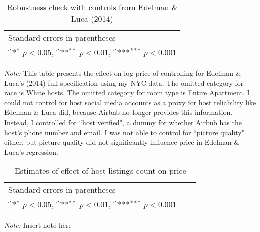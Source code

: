 \begin{table}[htbp]\centering
	\def\sym#1{\ifmmode^{#1}\else\(^{#1}\)\fi}
	
	\caption{Robustness check with controls from Edelman \& Luca (2014)}
	\begin{tabular}{l*{1}{c}}
		\hline\hline
		 
		\hline\hline
		\multicolumn{2}{l}{\footnotesize Standard errors in parentheses}\\
		\multicolumn{2}{l}{\footnotesize \sym{*} \(p<0.05\), \sym{**} \(p<0.01\), \sym{***} \(p<0.001\)}\\
	\end{tabular}
	\label{table:edelman}
	\begin{tablenotes}
		\item {\it Note:} This table presents the effect on log price of controlling for Edelman \& Luca's (2014) full specification using my NYC data. The omitted category for race is White hosts. The omitted category for room type is Entire Apartment. I could not control for host social media accounts as a proxy for host reliability like Edelman \& Luca did, because Airbnb no longer provides this information. Instead, I controlled for ``host verified", a dummy for whether Airbnb has the host's phone number and email. I was not able to control for ``picture quality" either, but picture quality did not significantly influence price in Edelman \& Luca's regression.
	\end{tablenotes}
\end{table}


\begin{table}[htbp]\centering
	\def\sym#1{\ifmmode^{#1}\else\(^{#1}\)\fi}
	\caption{Estimates of effect of host listings count on price}
	\begin{tabular}{l*{6}{c}}
		\hline\hline
		
		\hline\hline
		\multicolumn{5}{l}{\footnotesize Standard errors in parentheses}\\
		\multicolumn{5}{l}{\footnotesize \sym{*} \(p<0.05\), \sym{**} \(p<0.01\), \sym{***} \(p<0.001\)}\\
	\end{tabular}
	\label{table:robustness_listings_count}
	\begin{tablenotes}

		\item {\it Note:} Insert note here
	\end{tablenotes}
\end{table}


